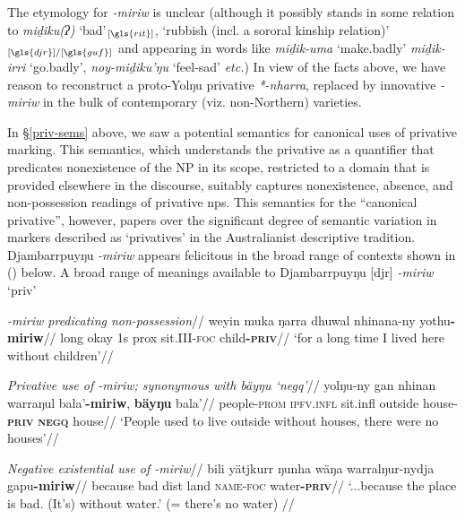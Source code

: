 \documentclass[usenames,dvipsnames,11pt]{article}
\begin{document}
{The etymology for \textit{-miriw} is unclear (although it possibly stands in some relation to \textit{miḏiku(ʔ)} `bad'$_{[\gls{rit}]}$, `rubbish (incl. a sororal kinship relation)'$_{[\gls{djr}]/[\gls{guf}]}$ and appearing in words like \textit{miḏik-uma} `make.badly' \textit{miḏik-irri} `go.badly', \textit{noy-miḏiku'ŋu} `feel-sad' \textit{etc.}) In view of the facts above, we have reason to reconstruct a proto-Yolŋu privative \textit{*-nharra}, replaced by innovative \textit{-miriw} in the bulk of contemporary (viz. non-Northern) varieties.

In §\ref{priv-sems} above, we saw a potential semantics for canonical uses of privative marking. This semantics, which understands the privative as a quantifier that predicates nonexistence of the NP in its scope, restricted to a domain that is provided elsewhere in the discourse, suitably captures nonexistence, absence, and non-possession readings of privative \gls{np}s. This semantics for the ``canonical privative'', however, papers over the significant degree of semantic variation in markers described as `privatives' in the Australianist descriptive tradition. Djambarrpuyŋu \textit{-miriw} appears felicitous in the broad range of contexts shown in (\nextx) below.
\pex A broad range of meanings available to Djambarrpuyŋu [\gls{djr}] \textit{-miriw} `\gls{priv}' 

\a\begingl\glpreamble \textit{\emph{-miriw} predicating non-possession}//
\gla weyin muka ŋarra dhuwal nhinana-ny yothu\textbf{-miriw}//
\glb long okay 1\gls{s} \gls{prox} sit.III-\textsc{foc} child\textsc{\textbf{-priv}}//
\glft`for a long time I lived here without children'//\endgl

\a\begingl\glpreamble \textit{Privative use of \emph{-miriw}; synonymous with \em{bäyŋu} `\gls{negq}'}//
\gla yolŋu-ny gan nhinan warraŋul bala'\textbf{-miriw}, \textbf{bäyŋu} bala'//
\glb people-\textsc{prom} \textsc{ipfv.infl} sit.\gls{infl} outside house\textsc{-\textbf{priv}} \textsc{\textbf{negq}} house//
\glft `People used to live outside without houses, there were no houses'//
\endgl

\a\begingl\glpreamble \textit{Negative existential use of \emph{-miriw}}//
\gla bili yätjkurr ŋunha wäŋa warralŋur-nydja gapu\textbf{-miriw}//
\glb because bad \gls{dist} land \textsc{name-foc} water\textsc{\textbf{-priv}}//
\glft `...because the place is bad. (It's) without water.' (= there's no water) 		//
\endgl

}
\end{document}
